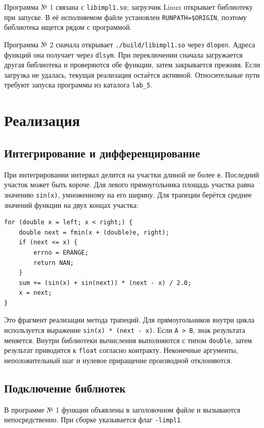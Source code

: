\documentclass[12pt,a4paper]{article}
\begin{document}
Программа № 1 связана с \texttt{libimpl1.so}; загрузчик Linux открывает
библиотеку при запуске. В её исполняемом файле установлен
\texttt{RUNPATH=\$ORIGIN}, поэтому библиотека ищется рядом с программой.

Программа № 2 сначала открывает \texttt{./build/libimpl1.so} через
\texttt{dlopen}. Адреса функций она получает через \texttt{dlsym}. При
переключении сначала загружается другая библиотека и проверяются обе функции,
затем закрывается прежняя. Если загрузка не удалась, текущая реализация
остаётся активной. Относительные пути требуют запуска программы из каталога
\texttt{lab\_5}.

\section{Реализация}

\subsection{Интегрирование и дифференцирование}

При интегрировании интервал делится на участки длиной не более \texttt{e}.
Последний участок может быть короче. Для левого прямоугольника площадь
участка равна значению \texttt{sin(x)}, умноженному на его ширину. Для трапеции
берётся среднее значений функции на двух концах участка:

\begin{verbatim}
for (double x = left; x < right;) {
    double next = fmin(x + (double)e, right);
    if (next <= x) {
        errno = ERANGE;
        return NAN;
    }
    sum += (sin(x) + sin(next)) * (next - x) / 2.0;
    x = next;
}
\end{verbatim}

Это фрагмент реализации метода трапеций. Для прямоугольников внутри цикла
используется выражение \texttt{sin(x) * (next - x)}. Если \texttt{A > B}, знак
результата меняется. Внутри библиотеки вычисления выполняются с типом
\texttt{double}, затем результат приводится к \texttt{float} согласно
контракту. Неконечные аргументы, неположительный шаг и нулевое приращение
производной отклоняются.

\subsection{Подключение библиотек}

В программе № 1 функции объявлены в заголовочном файле и вызываются
непосредственно. При сборке указывается флаг \texttt{-limpl1}.
\end{document}
